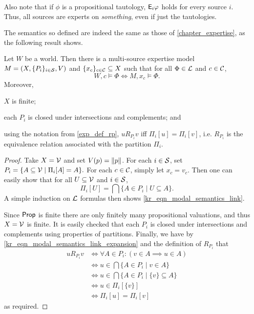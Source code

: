 Also note that if $\phi$ is a propositional tautology, $\mathsf{E}_i\varphi$ holds for
every source $i$. Thus, all sources are experts on \emph{something}, even if
just the tautologies.

The semantics so defined are indeed the same as those of
\cref{chapter_expertise}, as the following result shows.

\begin{proposition}
    \label{kr_prop_modal_semantics_link}
    Let $W$ be a world. Then there is a multi-source expertise model $M = (X,
    \{P_i\}_{i \in \mathcal{S}}, V)$ and $\{x_c\}_{c \in \mathcal{C}} \subseteq X$ such that
    for all $\Phi \in \mathcal{L}{}$ and $c \in \mathcal{C}$,
    \begin{equation}
        \label{kr_eqn_modal_semantics_link}
        W, c \models \Phi \iff M, x_c \models \Phi.
    \end{equation}
    Moreover,
    \begin{inlinelist}
        \item $X$ is finite;
        \item each $P_i$ is closed under intersections and complements; and
        \item using the notation from \cref{exp_def_rp}, $u R_{P_i} v$ iff
              $\Pi_i[u] = \Pi_i[v]$, i.e. $R_{P_i}$ is the equivalence relation
              associated with the partition $\Pi_i$.
    \end{inlinelist}
\end{proposition}

\begin{proof}
    Take $X = \mathcal{V}$ and set $V(p) = \|{p}\|$. For each $i \in \mathcal{S}$, set
    $P_i = \{A \subseteq \mathcal{V} \mid \Pi_i[A] = A\}.$ For each $c \in \mathcal{C}$,
    simply let $x_c = v_c$. Then one can easily show that for all $U \subseteq
    \mathcal{V}$ and $i \in \mathcal{S}$,
    \begin{equation}
        \label{kr_eqn_modal_semantics_link_expansion}
        \Pi_i[U] = \bigcap\{A \in P_i \mid U \subseteq A\}.
    \end{equation}
    A simple induction on $\mathcal{L}{}$ formulas then shows
    \cref{kr_eqn_modal_semantics_link}.

    Since $\mathsf{Prop}$ is finite there are only finitely many propositional
    valuations, and thus $X = \mathcal{V}$ is finite. It is easily checked that
    each $P_i$ is closed under intersections and complements using properties
    of partitions. Finally, we have by
    \cref{kr_eqn_modal_semantics_link_expansion} and the definition of
    $R_{P_i}$ that
    \begin{align*}
        u R_{P_i} v
        &\iff \forall A \in P_i: (v \in A \implies u \in A)  \\
        &\iff u \in \bigcap\{A \in P_i \mid v \in A\} \\
        &\iff u \in \bigcap\{A \in P_i \mid \{v\} \subseteq A\} \\
        &\iff u \in \Pi_i[\{v\}] \\
        &\iff \Pi_i[u] = \Pi_i[v]
    \end{align*}
    as required.
\end{proof}

